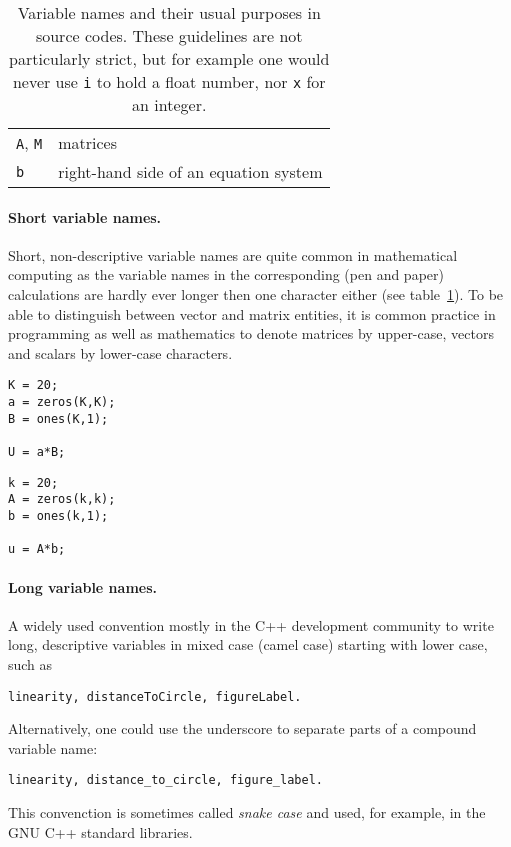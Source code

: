 \begin{itemize}
\begin{table}
\begin{tabular}{ll}
\lstinline!A!, \lstinline!M!                                  & matrices\\
\lstinline!b!                                                 & right-hand side of an equation system\\\bottomrule
\end{tabular}
\caption{Variable names and their usual purposes in source codes. These guidelines are not particularly strict, but for example one would never use \lstinline!i! to hold a float number, nor \lstinline!x! for an integer.}
\label{table:typical-variable-usage}
\end{table}
\end{itemize}

\paragraph{Short variable names.}
Short, non-descriptive variable names are quite common in mathematical
computing as the variable names in the corresponding (pen and paper)
calculations are hardly ever longer then one character either (see
table~\ref{table:typical-variable-usage}). To be able to distinguish between
vector and matrix entities, it is common practice in programming as well as
mathematics to denote matrices by upper-case, vectors and scalars by lower-case
characters.

\hfill
\begin{minipage}[t]{.45\textwidth}
\begin{lstlisting}[framerule=2pt,rulecolor=\color{badred}]
K = 20;
a = zeros(K,K);
B = ones(K,1);

U = a*B;
\end{lstlisting}
\end{minipage}
\hfill
\begin{minipage}[t]{.45\textwidth}
\begin{lstlisting}[framerule=2pt,rulecolor=\color{goodgreen}]
k = 20;
A = zeros(k,k);
b = ones(k,1);

u = A*b;
\end{lstlisting}
\end{minipage}
\hfill


\paragraph{Long variable names.}
A widely used convention mostly in the C++ development community to write
long, descriptive variables in mixed case (camel case) starting with lower
case, such as
\begin{lstlisting}
linearity, distanceToCircle, figureLabel.
\end{lstlisting}
Alternatively, one could use the underscore to separate parts of a compound
variable name:
\begin{lstlisting}
linearity, distance_to_circle, figure_label.
\end{lstlisting}
This convenction is sometimes called \emph{snake case} and used, for example,
in the GNU C++ standard libraries.

